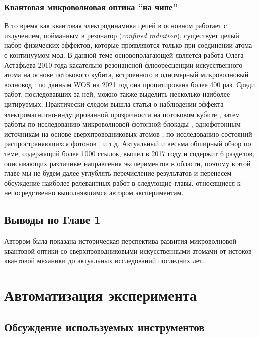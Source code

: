 \documentclass[14pt, a4paper]{extreport}
\numberwithin{equation}{section}
\begin{document}
\subsection{Квантовая микроволновая оптика ``на чипе''}

В то время как квантовая электродинамика цепей в основном работает с излучением, пойманным в резонатор (\textit{confined radiation}), существует целый набор физических эффектов, которые проявляются только при соединении атома с континуумом мод. В данной теме основополагающей является работа Олега Астафьева 2010 года касательно резонансной флюоресценции искусственного атома на основе потокового кубита, встроенного в одномерный микроволновый волновод \cite{astafiev2010resonance}: по данным WOS на 2021 год она процитирована более 400 раз. Среди работ, последовавших за ней, можно также выделить несколько наиболее цитируемых. Практически следом вышла статья о наблюдении эффекта электромагнитно-индуцированной прозрачности на потоковом кубите \cite{abdumalikov2010electromagnetically}, затем работы по исследованию микроволновой фотонной блокады \cite{lang2011observation}, однофотонным источникам на основе сверхпроводниковых атомов \cite{bozyigit2011antibunching,peng2016tuneable}, по исследованию состояний распространяющихся фотонов \cite{eichler2011experimental}, и т.д. Актуальный и весьма обширный обзор по теме, содержащий более 1000 ссылок, вышел в 2017 году \cite{gu2017microwave} и содержит 6 разделов, описывающих различные направления экспериментов в области, поэтому в этой главе мы не будем далее углублять перечисление результатов и перенесем обсуждение наиболее релевантных работ в следующие главы, относящиеся к непосредственно выполнявшимся автором экспериментам.

\section{Выводы по Главе 1}

Автором была показана историческая перспектива развития микроволновой квантовой оптики со сверхпроводниковыми искусственными атомами от истоков квантовой механики до актуальных исследований последних лет. 

\chapter{Автоматизация эксперимента}

\section{Обсуждение используемых инструментов}
\end{document}
